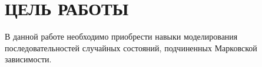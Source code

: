 \section{ЦЕЛЬ РАБОТЫ}

В данной работе необходимо приобрести навыки моделирования последовательностей
случайных состояний, подчиненных Марковской зависимости.
